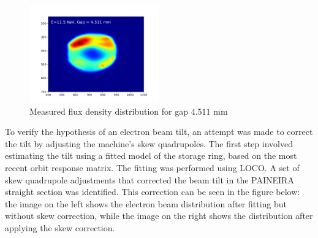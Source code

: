 \documentclass[a4paper,12pt]{article}
\begin{document}
\begin{figure}[H]
\centering
\includegraphics[width=0.5\textwidth]{images_E11500eV_G4.511mm.png}
\caption{Measured flux density distribution for gap $4.511$ mm}
\label{fig:meas_pt4}
\end{figure}

To verify the hypothesis of an electron beam tilt,
 an attempt was made to correct the tilt by adjusting
  the machine's skew quadrupoles. The first step involved
   estimating the tilt using a fitted model of the storage ring,
    based on the most recent orbit response matrix. The fitting
     was performed using LOCO. A set of skew quadrupole adjustments 
     that corrected the beam tilt in the PAINEIRA straight section
      was identified. This correction can be seen in the figure below:
       the image on the left shows the electron beam distribution after
        fitting but without skew correction, while the image on the right
         shows the distribution after applying the skew correction.
\end{document}
